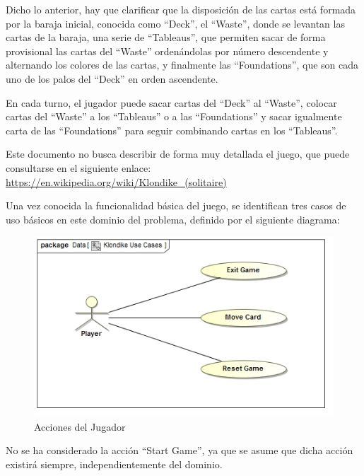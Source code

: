 \documentclass[11pt]{article}
\begin{document}
Dicho lo anterior, hay que clarificar que la disposición de las cartas está formada por la baraja inicial, conocida como ``Deck'', el ``Waste'', donde se levantan las cartas de la baraja, una serie de ``Tableaus'', que permiten sacar de forma provisional las cartas del ``Waste'' ordenándolas por número descendente y alternando los colores de las cartas, y finalmente las ``Foundations'', que son cada uno de los palos del ``Deck'' en orden ascendente.

En cada turno, el jugador puede sacar cartas del ``Deck'' al ``Waste'', colocar cartas del ``Waste'' a los ``Tableaus'' o a las ``Foundations'' y sacar igualmente carta de las ``Foundations'' para seguir combinando cartas en los ``Tableaus''.

Este documento no busca describir de forma muy detallada el juego, que puede consultarse en el siguiente enlace: \url{https://en.wikipedia.org/wiki/Klondike_(solitaire)}

Una vez conocida la funcionalidad básica del juego, se identifican tres casos de uso básicos en este dominio del problema, definido por el siguiente diagrama:

\begin{center}
 \begin{figure}[H]
 \begin{center}
   \includegraphics[width=13cm]{DomainModel/KlondikeUseCases.jpg}
   \caption{Acciones del Jugador}
   \label{fig:actions}
 \end{center}
 \end{figure}
\end{center}

No se ha considerado la acción ``Start Game'', ya que se asume que dicha acción existirá siempre, independientemente del dominio.
\end{document}
